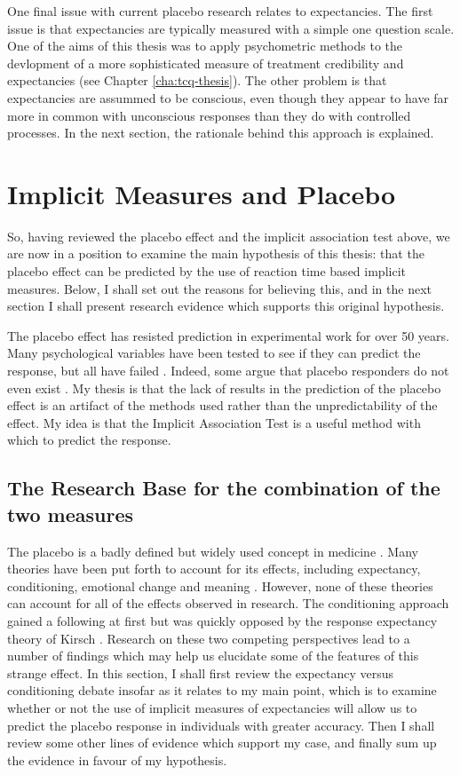 One final issue with current placebo research relates to expectancies. The first issue is that expectancies are typically measured with a simple one question scale. One of the aims of this thesis was to apply psychometric methods to the devlopment of a more sophisticated measure of treatment credibility and expectancies (see Chapter \ref{cha:tcq-thesis}). The other problem is that expectancies are assummed to be conscious, even though they appear to have far more in common with unconscious responses than they do with controlled processes. In the next section, the rationale behind this approach is explained. 

\section{Implicit Measures and Placebo}
\label{sec:impl-meas-plac}
So, having reviewed the placebo effect and the implicit association test above, we are now in a position to examine the main hypothesis of this thesis: that the placebo effect can be predicted by the use of reaction time based implicit measures. Below, I shall set out the reasons for believing this, and in the next section I shall present research evidence which supports this original hypothesis. 

The placebo effect has resisted prediction in experimental work for over 50 years. Many psychological variables have been tested to see if they can predict the response, but all have failed \cite{Shapiro1997}. Indeed, some argue that placebo responders do not even exist \cite{Kaptchuk2008a}. My thesis is that the lack of results in the prediction of the placebo effect is an artifact of the methods used rather than the unpredictability of the effect. My idea is that the Implicit Association Test is a useful method with which to predict the response. 


\subsection{The Research Base for the combination of the two measures}
\label{sec:rese-base-comb}
The placebo is a badly defined but widely used concept in medicine \cite{Kaptchuk1998} . Many theories have been put forth to account for its effects, including expectancy, conditioning, emotional change and meaning \cite{Stewart-Williams2004b}. However, none of these theories can account for all of the effects observed in research. The conditioning approach gained a following at first \cite{Voudouris1985}  but was quickly opposed by the response expectancy theory of Kirsch \cite{Kirsch1985,Kirsch1997}. Research on these two competing perspectives lead to a number of findings which may help us elucidate some of the features of this strange effect. In this section, I shall first review the expectancy versus conditioning debate insofar as it relates to my main point, which is to examine whether or not the use of implicit measures of expectancies will allow us to predict the placebo response in individuals with greater accuracy. Then I shall review some other lines of evidence which support my case, and finally sum up the evidence in favour of my hypothesis.


